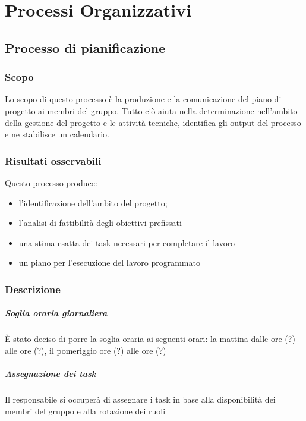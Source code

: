
\chapter{Processi Organizzativi}

\section{Processo di pianificazione}

\subsection{Scopo}

Lo scopo di questo processo è la produzione e la comunicazione del piano di progetto ai membri del gruppo. Tutto ciò aiuta nella determinazione nell'ambito della gestione del progetto e le attività tecniche, identifica gli output del processo e ne stabilisce un calendario.


\subsection{Risultati osservabili}

Questo processo produce:
\begin{itemize}

\item l'identificazione dell'ambito del progetto;
\item l'analisi di fattibilità degli obiettivi prefissati
\item una stima esatta dei task necessari per completare il lavoro
\item un piano per l'esecuzione del lavoro programmato

\end{itemize}

\subsection{Descrizione}

\paragraph*{Soglia oraria giornaliera}È stato deciso di porre la soglia oraria ai seguenti orari: la mattina dalle ore (?) alle ore (?), il pomeriggio  ore (?) alle ore (?) %

\paragraph*{Assegnazione dei task}Il responsabile si occuperà di assegnare i task in base alla disponibilità dei membri del gruppo e alla rotazione dei ruoli

